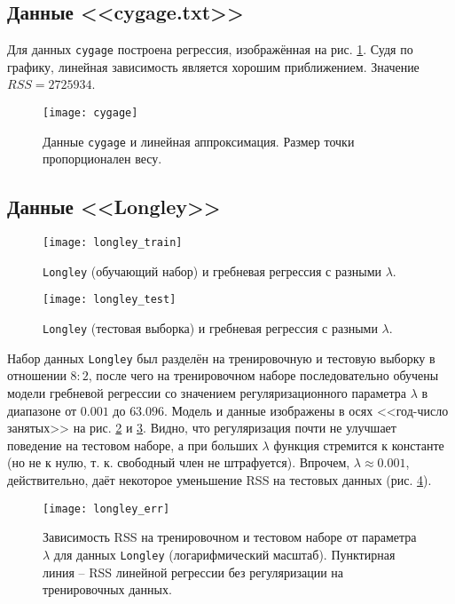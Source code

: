 \documentclass[a4paper,12pt]{article} %
\newcommand{\myPictWidth}{.95\textwidth}
\begin{document}
\subsection{Данные <<cygage.txt>>}

Для данных \texttt{cygage} построена регрессия, изображённая на рис. \ref{fig:cygage}.
Судя по графику, линейная зависимость является хорошим приближением.
Значение $ RSS = 2725934 $.

\begin{figure}[H]
    \centering \texttt{[image: cygage]}
    \caption{Данные \texttt{cygage} и линейная аппроксимация. Размер точки пропорционален весу.}
    \label{fig:cygage}
\end{figure}

\subsection{Данные <<Longley>>}

\begin{figure}[H]
    \centering \texttt{[image: longley\_train]}
    \caption{\texttt{Longley} (обучающий набор) и гребневая регрессия с разными $ \lambda $.}
    \label{fig:longley_train}
\end{figure}

\begin{figure}[H]
    \centering \texttt{[image: longley\_test]}
    \caption{\texttt{Longley} (тестовая выборка) и гребневая регрессия с разными $ \lambda $.}
    \label{fig:longley_test}
\end{figure}

\newpage
Набор данных \texttt{Longley} был разделён на тренировочную и тестовую выборку в отношении $8:2$, после чего на тренировочном наборе последовательно обучены модели гребневой регрессии со значением регуляризационного параметра $ \lambda $ в диапазоне от $ 0.001 $ до $ 63.096 $.
Модель и данные изображены в осях <<год-число занятых>> на рис. \ref{fig:longley_train} и \ref{fig:longley_test}.
Видно, что регуляризация почти не улучшает поведение на тестовом наборе, а при больших $ \lambda $ функция стремится к константе (но не к нулю, т. к. свободный член не штрафуется).
Впрочем, $ \lambda \approx 0.001 $, действительно, даёт некоторое уменьшение RSS на тестовых данных (рис. \ref{fig:longley_err}).

\begin{figure}[H]
    \centering \texttt{[image: longley\_err]}
    \caption{Зависимость RSS на тренировочном и тестовом наборе от параметра $ \lambda $ для данных \texttt{Longley} (логарифмический масштаб). Пунктирная линия -- RSS линейной регрессии без регуляризации на тренировочных данных. }
    \label{fig:longley_err}
\end{figure}
\end{document}
